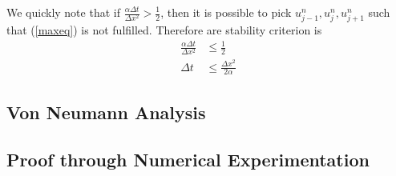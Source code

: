 We quickly note that if $\frac{\alpha \Delta t}{\Delta x^2}>\frac{1}{2}$, then it is possible to pick $u_{j-1}^n,u_j^n,u_{j+1}^n$ such that (\ref{maxeq}) is not fulfilled. Therefore are stability criterion is 
\begin{align*}
\frac{\alpha \Delta t}{\Delta x^2} &\leq \frac{1}{2} \\
\Delta t &\leq \frac{\Delta x^2}{2\alpha}
\end{align*}


\subsection{Von Neumann Analysis}


\subsection{Proof through Numerical Experimentation}
